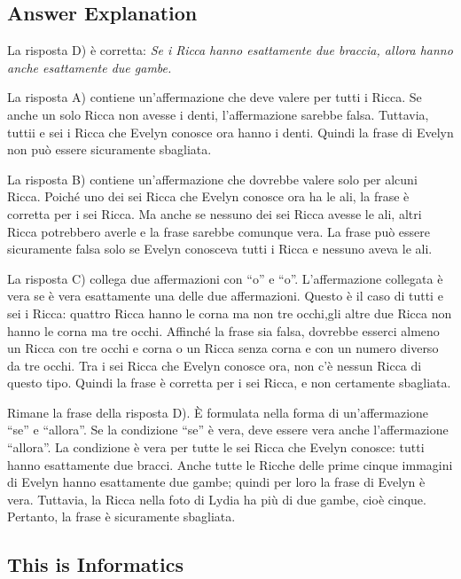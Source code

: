 \documentclass[a4paper,11pt]{report}
\begin{document}
\endgroup

\subsection*{Answer Explanation}

La risposta D) è corretta: \emph{Se i Ricca hanno esattamente due braccia, allora hanno anche esattamente due gambe.}

La risposta A) contiene un’affermazione che deve valere per tutti i Ricca. Se anche un solo Ricca non avesse i denti, l’affermazione sarebbe falsa. Tuttavia, tuttii e sei i Ricca che Evelyn conosce ora hanno i denti. Quindi la frase di Evelyn non può essere sicuramente sbagliata.

La risposta B) contiene un’affermazione che dovrebbe valere solo per alcuni Ricca. Poiché uno dei sei Ricca che Evelyn conosce ora ha le ali, la frase è corretta per i sei Ricca. Ma anche se nessuno dei sei Ricca avesse le ali, altri Ricca potrebbero averle e la frase sarebbe comunque vera. La frase può essere sicuramente falsa solo se Evelyn conosceva tutti i Ricca e nessuno aveva le ali.

La risposta C) collega due affermazioni con \enquote{o} e \enquote{o}. L’affermazione collegata è vera se è vera esattamente una delle due affermazioni. Questo è il caso di tutti e sei i Ricca: quattro Ricca hanno le corna ma non tre occhi,gli altre due Ricca non hanno le corna ma tre occhi. Affinché la frase sia falsa, dovrebbe esserci almeno un Ricca con tre occhi e corna o un Ricca senza corna e con un numero diverso da tre occhi. Tra i sei Ricca che Evelyn conosce ora, non c’è nessun Ricca di questo tipo.  Quindi la frase è corretta per i sei Ricca, e non certamente sbagliata.

Rimane la frase della risposta D). È formulata nella forma di un’affermazione \enquote{se} e \enquote{allora}. Se la condizione \enquote{se} è vera, deve essere vera anche l’affermazione \enquote{allora}. La condizione è vera per tutte le sei Ricca che Evelyn conosce: tutti hanno esattamente due bracci.  Anche tutte le Ricche delle prime cinque immagini di Evelyn hanno esattamente due gambe; quindi per loro la frase di Evelyn è vera.  Tuttavia, la Ricca nella foto di Lydia ha più di due gambe, cioè cinque. Pertanto, la frase è sicuramente sbagliata.


\subsection*{This is Informatics}
\end{document}
